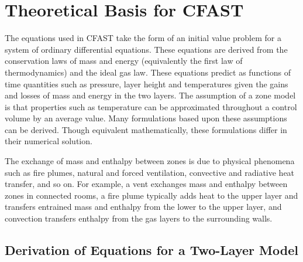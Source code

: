 \chapter{Theoretical Basis for CFAST}
\label{sec:Theory_Chapter}

The equations used in CFAST take the form of an initial value problem for a system of ordinary differential equations. These equations are derived from the conservation laws of mass and energy (equivalently the first law of thermodynamics) and the ideal gas law. These equations predict as functions of time quantities such as pressure, layer height and temperatures given the gains and losses of mass and energy in the two layers. The assumption of a zone model is that properties such as temperature can be approximated throughout a control volume by an average value. Many formulations based upon these assumptions can be derived. Though equivalent mathematically, these formulations differ in their numerical solution.

The exchange of mass and enthalpy between zones is due to physical phenomena such as fire plumes, natural and forced ventilation, convective and radiative heat transfer, and so on. For example, a vent exchanges mass and enthalpy between zones in connected rooms, a fire plume typically adds heat to the upper layer and transfers entrained mass and enthalpy from the lower to the upper layer, and convection transfers enthalpy from the gas layers to the surrounding walls.



\section{Derivation of Equations for a Two-Layer Model}

